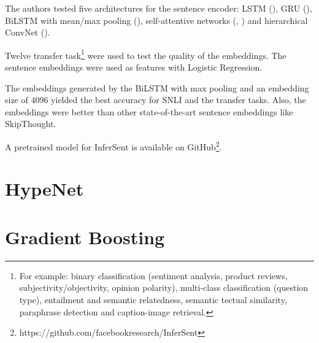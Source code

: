 The authors tested five architectures for the sentence encoder: LSTM (\cite{hochreiter1997long}), GRU (\cite{cho2014properties}), BiLSTM with mean/max pooling (\cite{collobert2008unified}), self-attentive networks (\cite{liu2016learning}, \cite{lin2017structured}) and hierarchical ConvNet (\cite{zhao2015self}). 

Twelve transfer task\footnote{For example: binary classification (sentiment analysis, product reviews, subjectivity/objectivity, opinion polarity), multi-class classification (question type), entailment and semantic relatedness, semantic tectual similarity, paraphrase detection and caption-image retrieval.} were used to test the quality of the embeddings. The sentence embeddings were used as features with Logistic Regression.

The embeddings generated by the BiLSTM with max pooling and an embedding size of 4096 yielded the best accuracy for SNLI and the transfer tasks. Also, the embeddings were better than other state-of-the-art sentence embeddings like SkipThought.

A pretrained model for InferSent is available on GitHub\footnote{https://github.com/facebookresearch/InferSent}.

\section{HypeNet}
\section{Gradient Boosting}